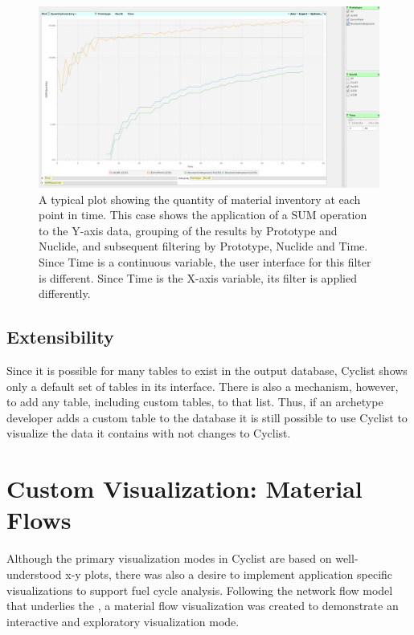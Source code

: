 \begin{figure}[htbp]
\begin{center}
\includegraphics[width=\columnwidth]{./images/plot-01-07}
\caption{A typical plot showing the quantity of material inventory at each
  point in time.  This case shows the application of a SUM operation to the
  Y-axis data, grouping of the results by Prototype and Nuclide, and
  subsequent filtering by Prototype, Nuclide and Time.  Since Time is a
  continuous variable, the user interface for this filter is different.  Since
  Time is the X-axis variable, its filter is applied differently.  }
\end{center}
\label{fig:plot-01-07}
\end{figure}

\subsection{Extensibility}

Since it is possible for many tables to exist in the \Cyclus output database,
Cyclist shows only a default set of tables in its interface.  There is also a
mechanism, however, to add any table, including custom tables, to that list.
Thus, if an archetype developer adds a custom table to the database it is
still possible to use Cyclist to visualize the data it contains with not
changes to Cyclist.

\section{Custom Visualization: Material Flows}

Although the primary visualization modes in Cyclist are based on
well-understood x-y plots, there was also a desire to implement application
specific visualizations to support fuel cycle analysis.  Following the network
flow model that underlies the \Cyclus, a material flow visualization was
created to demonstrate an interactive and exploratory visualization mode.

